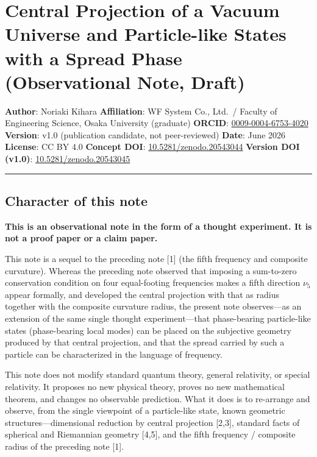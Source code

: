 \documentclass[
]{article}
\author{}
\date{}
\begin{document}
\section{Central Projection of a Vacuum Universe and Particle-like
States with a Spread Phase (Observational Note,
Draft)}\label{central-projection-of-a-vacuum-universe-and-particle-like-states-with-a-spread-phase-observational-note-draft}

\textbf{Author}: Noriaki Kihara \textbf{Affiliation}: WF System Co.,
Ltd.~/ Faculty of Engineering Science, Osaka University (graduate)
\textbf{ORCID}:
\href{https://orcid.org/0009-0004-6753-4020}{0009-0004-6753-4020}
\textbf{Version}: v1.0 (publication candidate, not peer-reviewed)
\textbf{Date}: June 2026 \textbf{License}: CC BY 4.0 \textbf{Concept
DOI}:
\href{https://doi.org/10.5281/zenodo.20543044}{10.5281/zenodo.20543044}
\textbf{Version DOI (v1.0)}:
\href{https://doi.org/10.5281/zenodo.20543045}{10.5281/zenodo.20543045}

\begin{center}\rule{0.5\linewidth}{0.5pt}\end{center}

\subsection{Character of this note}\label{character-of-this-note}

\textbf{This is an observational note in the form of a thought
experiment. It is not a proof paper or a claim paper.}

This note is a sequel to the preceding note {[}1{]} (the fifth frequency
and composite curvature). Whereas the preceding note observed that
imposing a sum-to-zero conservation condition on four equal-footing
frequencies makes a fifth direction \(\nu_5\) appear formally, and
developed the central projection with that as radius together with the
composite curvature radius, the present note observes---as an extension
of the same single thought experiment---that phase-bearing particle-like
states (phase-bearing local modes) can be placed on the subjective
geometry produced by that central projection, and that the spread
carried by such a particle can be characterized in the language of
frequency.

This note does not modify standard quantum theory, general relativity,
or special relativity. It proposes no new physical theory, proves no new
mathematical theorem, and changes no observable prediction. What it does
is to re-arrange and observe, from the single viewpoint of a
particle-like state, known geometric structures---dimensional reduction
by central projection {[}2,3{]}, standard facts of spherical and
Riemannian geometry {[}4,5{]}, and the fifth frequency / composite
radius of the preceding note {[}1{]}.
\end{document}
